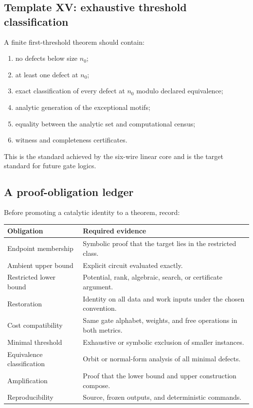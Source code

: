 \subsection{Template XV: exhaustive threshold classification}
A finite first-threshold theorem should contain:
\begin{enumerate}
\item no defects below size $n_0$;
\item at least one defect at $n_0$;
\item exact classification of every defect at $n_0$ modulo declared equivalence;
\item analytic generation of the exceptional motifs;
\item equality between the analytic set and computational census;
\item witness and completeness certificates.
\end{enumerate}
This is the standard achieved by the six-wire linear core and is the target standard for future gate logics.

\subsection{A proof-obligation ledger}
Before promoting a catalytic identity to a theorem, record:
\begin{longtable}{@{}p{}p{}@{}}
\toprule
Obligation & Required evidence\\
\midrule
Endpoint membership & Symbolic proof that the target lies in the restricted class.\\
Ambient upper bound & Explicit circuit evaluated exactly.\\
Restricted lower bound & Potential, rank, algebraic, search, or certificate argument.\\
Restoration & Identity on all data and work inputs under the chosen convention.\\
Cost compatibility & Same gate alphabet, weights, and free operations in both metrics.\\
Minimal threshold & Exhaustive or symbolic exclusion of smaller instances.\\
Equivalence classification & Orbit or normal-form analysis of all minimal defects.\\
Amplification & Proof that the lower bound and upper construction compose.\\
Reproducibility & Source, frozen outputs, and deterministic commands.\\
\bottomrule
\end{longtable}

